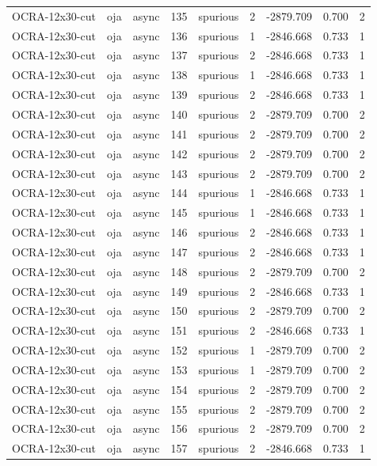 \begin{tabular}{lllrlrrrr}
OCRA-12x30-cut & oja & async & 135 & spurious & 2 & -2879.709 & 0.700 & 2 \\
OCRA-12x30-cut & oja & async & 136 & spurious & 1 & -2846.668 & 0.733 & 1 \\
OCRA-12x30-cut & oja & async & 137 & spurious & 2 & -2846.668 & 0.733 & 1 \\
OCRA-12x30-cut & oja & async & 138 & spurious & 1 & -2846.668 & 0.733 & 1 \\
OCRA-12x30-cut & oja & async & 139 & spurious & 2 & -2846.668 & 0.733 & 1 \\
OCRA-12x30-cut & oja & async & 140 & spurious & 2 & -2879.709 & 0.700 & 2 \\
OCRA-12x30-cut & oja & async & 141 & spurious & 2 & -2879.709 & 0.700 & 2 \\
OCRA-12x30-cut & oja & async & 142 & spurious & 2 & -2879.709 & 0.700 & 2 \\
OCRA-12x30-cut & oja & async & 143 & spurious & 2 & -2879.709 & 0.700 & 2 \\
OCRA-12x30-cut & oja & async & 144 & spurious & 1 & -2846.668 & 0.733 & 1 \\
OCRA-12x30-cut & oja & async & 145 & spurious & 1 & -2846.668 & 0.733 & 1 \\
OCRA-12x30-cut & oja & async & 146 & spurious & 2 & -2846.668 & 0.733 & 1 \\
OCRA-12x30-cut & oja & async & 147 & spurious & 2 & -2846.668 & 0.733 & 1 \\
OCRA-12x30-cut & oja & async & 148 & spurious & 2 & -2879.709 & 0.700 & 2 \\
OCRA-12x30-cut & oja & async & 149 & spurious & 2 & -2846.668 & 0.733 & 1 \\
OCRA-12x30-cut & oja & async & 150 & spurious & 2 & -2879.709 & 0.700 & 2 \\
OCRA-12x30-cut & oja & async & 151 & spurious & 2 & -2846.668 & 0.733 & 1 \\
OCRA-12x30-cut & oja & async & 152 & spurious & 1 & -2879.709 & 0.700 & 2 \\
OCRA-12x30-cut & oja & async & 153 & spurious & 1 & -2879.709 & 0.700 & 2 \\
OCRA-12x30-cut & oja & async & 154 & spurious & 2 & -2879.709 & 0.700 & 2 \\
OCRA-12x30-cut & oja & async & 155 & spurious & 2 & -2879.709 & 0.700 & 2 \\
OCRA-12x30-cut & oja & async & 156 & spurious & 2 & -2879.709 & 0.700 & 2 \\
OCRA-12x30-cut & oja & async & 157 & spurious & 2 & -2846.668 & 0.733 & 1 \\

\end{tabular}
